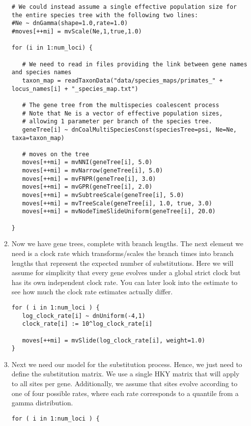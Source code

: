 \begin{enumerate}
{\begin{snugshade*}
\begin{lstlisting}
# We could instead assume a single effective population size for the entire species tree with the following two lines:
#Ne ~ dnGamma(shape=1.0,rate=1.0)
#moves[++mi] = mvScale(Ne,1,true,1.0)

for (i in 1:num_loci) {

   # We need to read in files providing the link between gene names and species names
   taxon_map = readTaxonData("data/species_maps/primates_" + locus_names[i] + "_species_map.txt")

   # The gene tree from the multispecies coalescent process
   # Note that Ne is a vector of effective population sizes, 
   # allowing 1 parameter per branch of the species tree.
   geneTree[i] ~ dnCoalMultiSpeciesConst(speciesTree=psi, Ne=Ne, taxa=taxon_map)

   # moves on the tree
   moves[++mi] = mvNNI(geneTree[i], 5.0)
   moves[++mi] = mvNarrow(geneTree[i], 5.0)
   moves[++mi] = mvFNPR(geneTree[i], 3.0)
   moves[++mi] = mvGPR(geneTree[i], 2.0)
   moves[++mi] = mvSubtreeScale(geneTree[i], 5.0)
   moves[++mi] = mvTreeScale(geneTree[i], 1.0, true, 3.0)
   moves[++mi] = mvNodeTimeSlideUniform(geneTree[i], 20.0)

}

\end{lstlisting}
\end{snugshade*}}

\item Now we have gene trees, complete with branch lengths. 
The next element we need is a clock rate which transforms/scales the branch times into branch lengths that represent the expected number of substitutions.
Here we will assume for simplicity that every gene evolves under a global strict clock but has its own independent clock rate.
You can later look into the estimate to see how much the clock rate estimates actually differ.
{\tt \begin{snugshade*}
\begin{lstlisting}
for ( i in 1:num_loci ) { 
   log_clock_rate[i] ~ dnUniform(-4,1)
   clock_rate[i] := 10^log_clock_rate[i]
   
   moves[++mi] = mvSlide(log_clock_rate[i], weight=1.0)
}
\end{lstlisting}
\end{snugshade*}}

\item Next we need our model for the substitution process. 
Hence, we just need to define the substitution matrix. 
We use a single HKY matrix that will apply to all sites per gene.
Additionally, we assume that sites evolve according to one of four possible rates, where each rate corresponds to a quantile from a gamma distribution.
{\tt \begin{snugshade*}
\begin{lstlisting}
for ( i in 1:num_loci ) {


\end{lstlisting}
\end{snugshade*}}
\end{enumerate}
